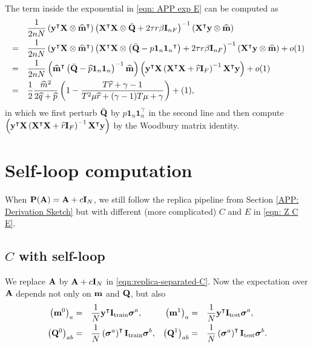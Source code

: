 \documentclass[9pt,twocolumn]{pnas-new}
\begin{document}
The term inside the exponential in \eqref{eqn: APP exp E} can be computed as
\begin{equation*}
\begin{aligned}
    & &&\frac{1}{2nN}\left( \vy^{\intercal} \mX \otimes \widehat{\vm}^{\intercal} \right)\left(  \mX^{\intercal} \mX \otimes \bar{\mQ}+2\tau r \beta \mI_{n F}\right)^{-1}\left(\mX^{\intercal}\vy \otimes  \widehat{\vm} \right)\\
    &=&&\frac{1}{2nN}\left( \vy^{\intercal} \mX \otimes \widehat{\vm}^{\intercal} \right)\left(  \mX^{\intercal} \mX \otimes \left(\bar{\mQ}-p{\mathbf{1}_n \mathbf{1}_n}^\intercal \right)+2\tau r \beta \mI_{n F}\right)^{-1}\left(\mX^{\intercal}  \vy \otimes \widehat{\vm} \right)+o(1)\\
    &=&&\frac{1}{2nN}\left(\widehat{\vm}^{\intercal} \left(\bar{\mQ}-\widehat{p}{\mathbf{1}_n\mathbf{1}_n}\right)^{-1} \widehat{\vm}\right)\left(\vy^{\intercal}\mX\left(\mX^{\intercal}\mX+\widehat{r}\mI_F\right)^{-1}\mX^{\intercal}\vy\right)+o(1)\\
    &=&&\frac{1}{2} \frac{\widehat{m}^2  }{2\widehat{q}+\widehat{p}}  \left(1-\frac{T\widehat{r}+\gamma-1}{T^2 \mu \widehat{r} +(\gamma -1) T \mu +\gamma}\right)+\title{o}(1),
    \end{aligned}
\end{equation*}
in which we first perturb $\bar{\mathbf{Q}}$ by $p\boldsymbol{1}_n\boldsymbol{1}_n^\intercal$ in the second line and then compute $\left(\mathbf{y}^{\intercal}\mathbf{X}\left(\mathbf{X}^{\intercal}\mathbf{X}+\widehat{r}\mathbf{I}_F\right)^{-1}\mathbf{X}^{\intercal}\mathbf{y}\right)$ by the Woodbury matrix identity.


\section{Self-loop computation}\label{APP: Selfloop}

When $\mathbf{P}(\mathbf{A})=\mathbf{A}+c\mathbf{I}_N$, we still follow the replica pipeline from Section \ref{APP: Derivation Sketch} but with different (more complicated) $C$ and $E$ in \eqref{eqn: Z C E}.
\subsection{$C$ with self-loop} We replace $\mathbf{A}$ by $\mathbf{A}+c\mathbf{I}_N$ in \eqref{eqn:replica-separated-C}. Now the expectation over $\mathbf{A}$ depends not only on $\mathbf{m}$ and $\mathbf{Q}$, but also
\begin{equation}\label{eqn: new order para}
\begin{aligned}
    \left(\mathbf{m}^0\right)_a&=&&\frac{1}{N}\mathbf{y}^\intercal \mathbf{I}_{\text{train}}\boldsymbol{\sigma}^a, & \left(\mathbf{m}^1\right)_a&=&&\frac{1}{N}\mathbf{y}^\intercal \mathbf{I}_{\text{test}}\boldsymbol{\sigma}^a,\\
    \left(\mathbf{Q}^0\right)_{ab}&=&&\frac{1}{N} \left(\boldsymbol{\sigma}^a\right)^\intercal \mathbf{I}_{\text{train}}\boldsymbol{\sigma}^b, & \left(\mathbf{Q}^1\right)_{ab}&=&&\frac{1}{N} \left(\boldsymbol{\sigma}^a\right)^\intercal \mathbf{I}_{\text{test}}\boldsymbol{\sigma}^b.
\end{aligned}
\end{equation}
\end{document}
